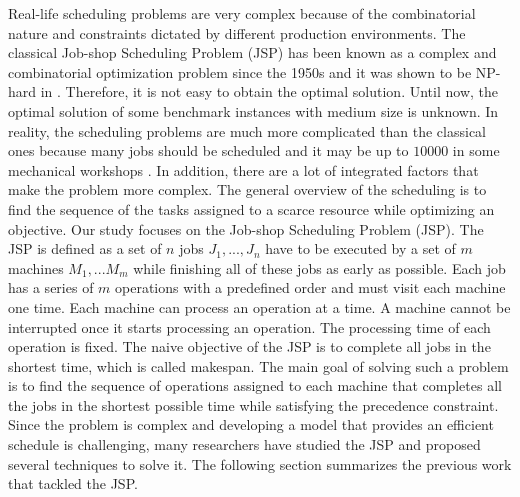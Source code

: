 \documentclass[submission,copyright,creativecommons]{eptcs}
\begin{document}
Real-life scheduling problems are very complex because of the combinatorial nature and constraints dictated by different production environments. The classical Job-shop Scheduling Problem (JSP) has been known as a complex and combinatorial optimization problem since the 1950s and it was shown to be NP-hard in \cite{lenstra1977complexity}. Therefore, it is not easy to obtain the optimal solution. Until now, the optimal solution of some benchmark instances with medium size is unknown. In reality, the scheduling problems are much more complicated than the classical ones because many jobs should be scheduled and it may be up to $10000$ in some mechanical workshops \cite{zhang2010hybrid}. In addition, there are a lot of integrated factors that make the problem more complex. The general overview of the scheduling is to find the sequence of the tasks assigned to a scarce resource while optimizing an objective. Our study focuses on the Job-shop Scheduling Problem (JSP). The JSP is defined as a set of $n$ jobs $J_{1}, ..., J_{n}$ have to be executed by a set of $m$ machines $M_{1}, ... M_{m}$ while finishing all of these jobs as early as possible. Each job has a series of $m$ operations with a predefined order and must visit each machine one time. Each machine can process an operation at a time. A machine cannot be interrupted once it starts processing an operation. The processing time of each operation is fixed. The naive objective of the JSP is to complete all jobs in the shortest time, which is called makespan. The main goal of solving such a problem is to find the sequence of operations assigned to each machine that completes all the jobs in the shortest possible time while satisfying the precedence constraint. Since the problem is complex and developing a model that provides an efficient schedule is challenging, many researchers have studied the JSP and proposed several techniques to solve it. The following section summarizes the previous work that tackled the JSP.
\end{document}
